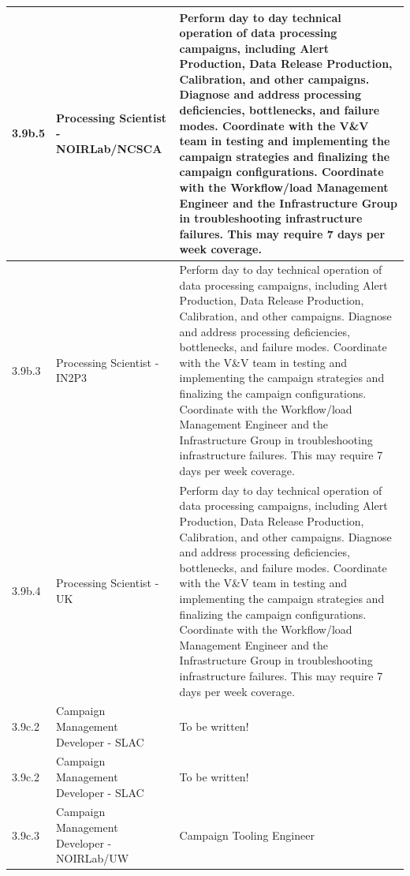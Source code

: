 \begin{longtable} {|p{}|p{}|p{}|}
{3.9b.5}&{Processing Scientist - NOIRLab/NCSCA}&{Perform day to day technical operation of data processing campaigns, including Alert Production, Data Release Production, Calibration, and other campaigns. Diagnose and address processing deficiencies, bottlenecks, and failure modes. Coordinate with the V\&V team in testing and implementing the campaign strategies and finalizing the campaign configurations. Coordinate with the Workflow/load Management Engineer and the Infrastructure Group in troubleshooting infrastructure failures. This may require 7 days per week coverage.} \\ \hline
{3.9b.3}&{Processing Scientist - IN2P3}&{Perform day to day technical operation of data processing campaigns, including Alert Production, Data Release Production, Calibration, and other campaigns. Diagnose and address processing deficiencies, bottlenecks, and failure modes. Coordinate with the V\&V team in testing and implementing the campaign strategies and finalizing the campaign configurations. Coordinate with the Workflow/load Management Engineer and the Infrastructure Group in troubleshooting infrastructure failures. This may require 7 days per week coverage.} \\ \hline
{3.9b.4}&{Processing Scientist - UK}&{Perform day to day technical operation of data processing campaigns, including Alert Production, Data Release Production, Calibration, and other campaigns. Diagnose and address processing deficiencies, bottlenecks, and failure modes. Coordinate with the V\&V team in testing and implementing the campaign strategies and finalizing the campaign configurations. Coordinate with the Workflow/load Management Engineer and the Infrastructure Group in troubleshooting infrastructure failures. This may require 7 days per week coverage.} \\ \hline
{3.9c.2}&{Campaign Management Developer - SLAC}&{To be written!} \\ \hline
{3.9c.2}&{Campaign Management Developer - SLAC}&{To be written!} \\ \hline
{3.9c.3}&{Campaign Management Developer - NOIRLab/UW}&{Campaign Tooling Engineer} \\ \hline
\end{longtable} \normalsize
